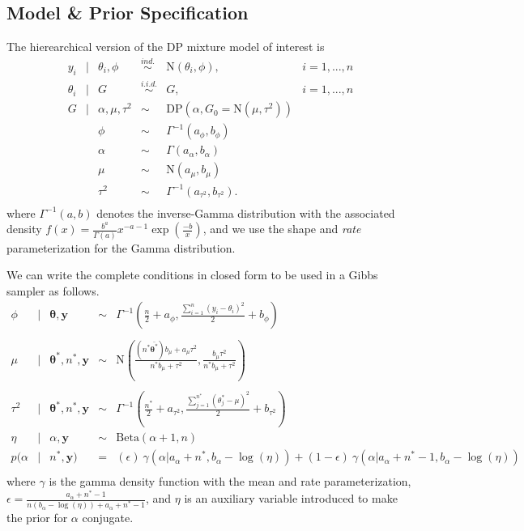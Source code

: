 \documentclass{article}
\def\suml{\sum\limits_{i=1}^n}
\def\ds{\displaystyle}
\newcommand{\m}[1]{\mathbf{\bm{#1}}} %
\def \stv{ \m{\theta} }
\def \stu{ \m{\theta^*} }
\def \y {\m{y}}
\begin{document}
\subsection{Model \& Prior Specification}
The hierearchical version of the DP mixture model of interest is 
\[
\begin{array}{rclcll}
  y_i &|& \theta_i,\phi &\overset{ind.}{\sim}& \text{N}(\theta_i, \phi), & i = 1,...,n\\
  \theta_i &|& G &\overset{i.i.d.}{\sim}&  G, & i = 1,...,n\\
  G &|& \alpha, \mu, \tau^2 &\sim& \text{DP}(\alpha, G_0=\text{N}(\mu,\tau^2))\\
    && \phi &\sim& \Gamma^{-1}(a_\phi,b_\phi) \\
    && \alpha &\sim& \Gamma(a_\alpha,b_\alpha) \\
    && \mu &\sim& \text{N}(a_\mu,b_\mu) \\
    && \tau^2 &\sim& \Gamma^{-1}(a_{\tau^2},b_{\tau^2}).\\
\end{array}
\]
where $\Gamma^{-1}(a,b)$ denotes the inverse-Gamma distribution with the associated density 
$f(x) = \ds \frac{b^a}{\Gamma(a)} x^{-a-1} \exp\left(\frac{-b}{x}\right)$, and we use the
shape and \emph{rate} parameterization for the Gamma distribution.

\noindent
We can write the complete conditions in closed form to be used in a Gibbs sampler as follows.
\[
\begin{array} {rclcl}
  \phi &|& \stv, \y &\sim& \Gamma^{-1}\left(\ds\frac{n}{2}+a_\phi,\frac{\suml (y_i-\theta_i)^2}{2} + b_\phi \right)\\
  \\
  \mu &|& \stu, n^*, \y &\sim& \text{N}\left(\ds \frac{(n^*\bar{\stu}) b_\mu + a_\mu\tau^2}{n^*b_\mu + \tau^2},
    \ds\frac{b_\mu \tau^2}{n^* b_\mu + \tau^2} \right)\\
  \\
  \tau^2 &|& \stu, n^*, \y &\sim& \Gamma^{-1}\left(\ds\frac{n^*}{2}+a_{\tau^2},
    \frac{\sum_{j=1}^{n^*} (\theta_j^*-\mu)^2}{2} + b_{\tau^2} \right)\\
  \eta &|& \alpha, \y &\sim& \text{Beta}(\alpha+1,n) \\
  p(\alpha &|& n^*, \y) &=& (\epsilon)~\gamma(\alpha | a_\alpha+n^*, b_\alpha-\log(\eta)) +
    (1-\epsilon)~\gamma(\alpha | a_\alpha+n^*-1, b_\alpha-\log(\eta))\\
\end{array}
\]
where $\gamma$ is the gamma density function with the mean and rate parameterization, 
$\epsilon = \ds\frac{a_\alpha +n^* - 1}{ n(b_\alpha-\log(\eta)) + a_\alpha +n^* -1}$,
and $\eta$ is an auxiliary variable introduced to make the prior for $\alpha$ conjugate.\\ %
\end{document}
